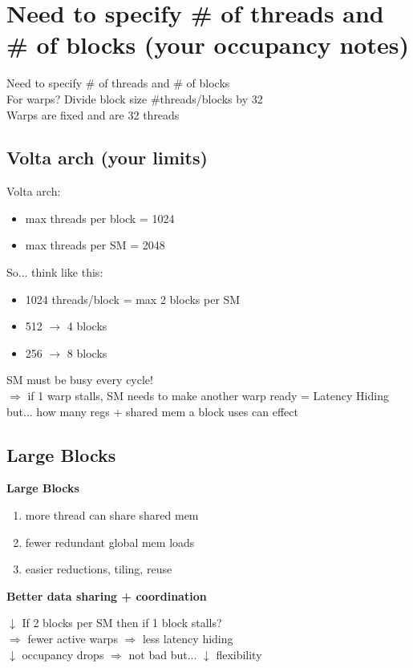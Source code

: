 \documentclass[11pt]{article}
\newcommand{\blue}[1]{\textcolor{myblue}{#1}}
\newcommand{\red}[1]{\textcolor{myred}{#1}}
\begin{document}
\section{\blue{Need to specify \# of threads and \# of blocks (your occupancy notes)}}

Need to specify \# of threads and \# of blocks\\
For warps? Divide block size \#threads/blocks by 32\\
Warps are fixed and are \red{32 threads}

\subsection*{\blue{Volta arch (your limits)}}
Volta arch:
\begin{itemize}
\item max threads per block = 1024
\item max threads per SM = 2048
\end{itemize}

So... think like this:
\begin{itemize}
\item 1024 threads/block = max 2 blocks per SM
\item 512 $\rightarrow$ 4 blocks
\item 256 $\rightarrow$ 8 blocks
\end{itemize}

SM must be busy every cycle!\\
$\Rightarrow$ if 1 warp stalls, SM needs to make another warp ready = \red{Latency Hiding}\\
but... how many regs + shared mem a block uses can effect

\subsection*{\blue{Large Blocks}}
\textbf{Large Blocks}
\begin{enumerate}
\item more thread can share shared mem \checkmark
\item fewer redundant global mem loads \checkmark
\item easier reductions, tiling, reuse \checkmark
\end{enumerate}
\textbf{Better data sharing + coordination}

\red{$\downarrow$ If 2 blocks per SM then if 1 block stalls?}\\
$\Rightarrow$ fewer active warps $\Rightarrow$ less latency hiding\\
\red{$\downarrow$ occupancy drops} $\Rightarrow$ \blue{not bad} but... \red{$\downarrow$ flexibility}
\end{document}
